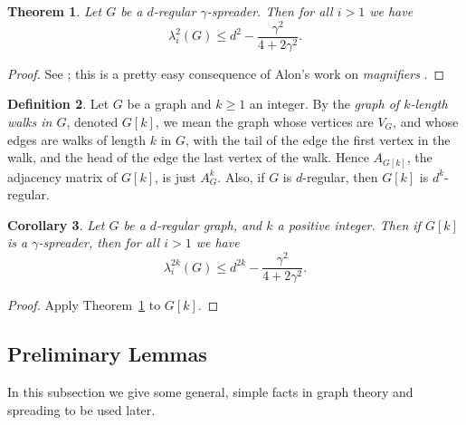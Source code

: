 \documentclass{memo-l}
\theoremstyle{plain}
\newtheorem{theorem}{Theorem}[section]
\newtheorem{corollary}[theorem]{Corollary}
\theoremstyle{definition}
\newtheorem{definition}[theorem]{Definition}
\numberwithin{section}{chapter}
\numberwithin{equation}{chapter}
\theoremstyle{plain}
\theoremstyle{definition}
\begin{document}
\begin{theorem}\label{th:separation}
Let $G$ be a $d$-regular $\gamma$-spreader.
Then for all $i>1$ we have 
$$
\lambda_i^2(G) \le d^2 -\frac{\gamma^2}{4+2\gamma^2}.
$$
\end{theorem}
\begin{proof}
See \cite{friedman_alon}; this is a pretty easy consequence of
Alon's work on {\em magnifiers} \cite{alon_eigenvalues}.
\end{proof}

\begin{definition} 
\label{de:k_walk_graph}
Let $G$ be a graph and $k\ge 1$ an integer.
By the {\em graph of $k$-length walks in $G$}, denoted $G[k]$, we mean
the graph whose vertices
are $V_G$, and whose edges are walks of length $k$ in $G$, with the
tail of the edge the first vertex in the walk, and the head of the
edge the last vertex of the walk.
Hence $A_{G[k]}$, the adjacency matrix of
$G[k]$, is just $A_G^k$.  Also, if $G$ is $d$-regular, then
$G[k]$ is $d^k$-regular.
\end{definition}

\begin{corollary}\label{co:weak_separation}
Let $G$ be a $d$-regular graph, and $k$ a positive integer.
Then if $G[k]$ is a $\gamma$-spreader,
then for all $i>1$ we have
$$
\lambda_i^{2k}(G) \le d^{2k} -\frac{\gamma^2}{4+2\gamma^2}.
$$
\end{corollary}
\begin{proof} Apply Theorem~\ref{th:separation} to $G[k]$.
\end{proof}

\subsection{Preliminary Lemmas}

In this subsection we give some general, simple facts in graph theory and
spreading to be used later.  
\end{document}

